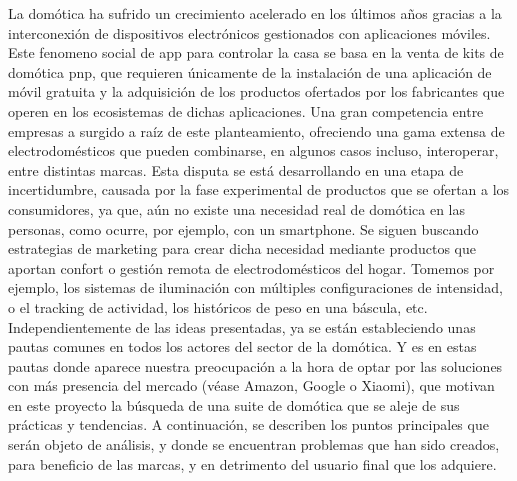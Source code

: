 La domótica ha sufrido un crecimiento acelerado en los últimos años gracias a la interconexión de dispositivos electrónicos gestionados con aplicaciones móviles. Este fenomeno social de \gls{app} para controlar la casa se basa en la venta de kits de domótica \Gls{pnp}, que requieren únicamente de la instalación de una aplicación de móvil gratuita y la adquisición de los productos ofertados por los fabricantes que operen en los ecosistemas de dichas aplicaciones. Una gran competencia entre empresas a surgido a raíz de este planteamiento, ofreciendo una gama extensa de electrodomésticos que pueden combinarse, en algunos casos incluso, interoperar, entre distintas marcas. Esta disputa se está desarrollando en una etapa de incertidumbre, causada por la fase experimental de productos que se ofertan a los consumidores, ya que, aún no existe una necesidad real de domótica en las personas, como ocurre, por ejemplo, con un \gls{smartphone}. Se siguen buscando estrategias de marketing para crear dicha necesidad mediante productos que aportan confort o gestión remota de electrodomésticos del hogar. Tomemos por ejemplo, los sistemas de iluminación con múltiples configuraciones de intensidad, o el tracking de actividad, los históricos de peso en una báscula, etc. Independientemente de las ideas presentadas, ya se están estableciendo unas pautas comunes en todos los actores del sector de la domótica. Y es en estas pautas donde aparece nuestra preocupación a la hora de optar por las soluciones con más presencia del mercado (véase Amazon, Google o Xiaomi), que motivan en este proyecto la búsqueda de una suite de domótica que se aleje de sus prácticas y tendencias. A continuación, se describen los puntos principales que serán objeto de análisis, y donde se encuentran problemas que han sido creados, para beneficio de las marcas, y en detrimento del usuario final que los adquiere.

\vspace{1cm}

